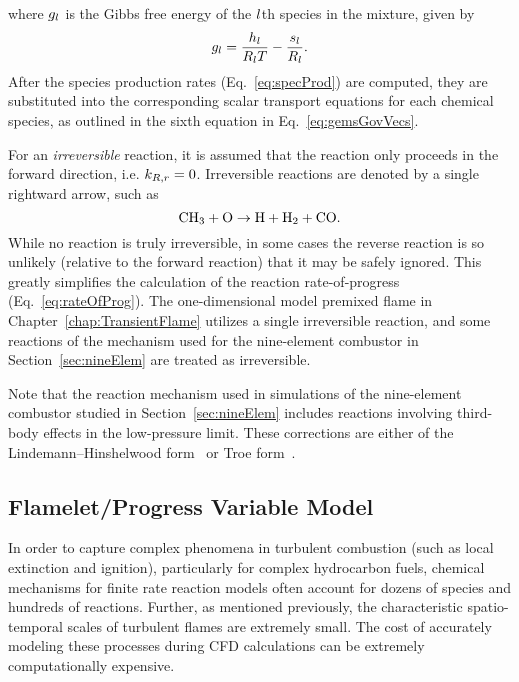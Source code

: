 %
where $g_{l}$ is the Gibbs free energy of the $l$th species in the mixture, given by
%
\begin{equation}\label{eq:gibbsSpec}
	g_{l} = \frac{h_{l}}{R_{l} T} - \frac{s_{l}}{R_{l}}.
\end{equation}
%
After the species production rates (Eq.~\ref{eq:specProd}) are computed, they are substituted into the corresponding scalar transport equations for each chemical species, as outlined in the sixth equation in Eq.~\ref{eq:gemsGovVecs}.

For an \textit{irreversible} reaction, it is assumed that the reaction only proceeds in the forward direction, i.e. $k_{R,r} = 0$. Irreversible reactions are denoted by a single rightward arrow, such as
%
\begin{equation}
	\text{CH}_3 + \text{O} \rightarrow \text{H} + \text{H}_2 + \text{CO}.
\end{equation}
%
While no reaction is truly irreversible, in some cases the reverse reaction is so unlikely (relative to the forward reaction) that it may be safely ignored. This greatly simplifies the calculation of the reaction rate-of-progress (Eq.~\ref{eq:rateOfProg}). The one-dimensional model premixed flame in Chapter~\ref{chap:TransientFlame} utilizes a single irreversible reaction, and some reactions of the mechanism used for the nine-element combustor in Section~\ref{sec:nineElem} are treated as irreversible.

Note that the reaction mechanism used in simulations of the nine-element combustor studied in Section~\ref{sec:nineElem} includes reactions involving third-body effects in the low-pressure limit. These corrections are either of the Lindemann--Hinshelwood form~\cite{Hinshelwood1926} or Troe form~\cite{Gilbert1983}.

\subsection{Flamelet/Progress Variable Model}\label{sec:fpv}
%
In order to capture complex phenomena in turbulent combustion (such as local extinction and ignition), particularly for complex hydrocarbon fuels, chemical mechanisms for finite rate reaction models often account for dozens of species and hundreds of reactions. Further, as mentioned previously, the characteristic spatio-temporal scales of turbulent flames are extremely small. The cost of accurately modeling these processes during CFD calculations can be extremely computationally expensive.


